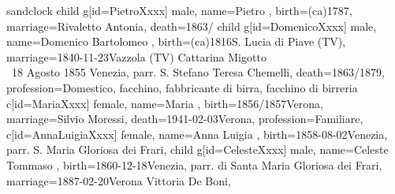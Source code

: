\documentclass{article}
\begin{document}
\begin{midpage}
\begin{center}

\begin{genealogypicture}[
    processing=database,
    database format=full,
    node size=3.5cm,
    level size=2.8cm,
    level distance=6mm,
    list separators hang=3mm,
    name font=\bfseries,
    surn code={\textcolor{black!50!black}{#1}},
    place text={\newline}{},
    date format=d month yyyy,
    tcbset={male/.style={colframe=blue,colback=blue!5},
    female/.style={colframe=red,colback=red!5}},
    box={fit basedim=7pt,boxsep=2pt,segmentation style=solid,
        halign=left,before upper=\parskip1pt,
        \gtrDBsex,
    },
]
sandclock
{
    child{
        g[id=PietroXxxx]{
            male,
            name={Pietro },
            birth={(ca)1787}{},
            marriage={Rivaletto Antonia}{},
            death={1863/}{}
        }
        child{
            g[id=DomenicoXxxx]{
                male,
                name={Domenico Bartolomeo },
                birth={(ca)1816}{S. Lucia di Piave (TV)},
                marriage={1840-11-23}{Vazzola (TV) \newline Cattarina Migotto \\ \gtrsymMarried~18 Agosto 1855 \newline \hspace*{3mm} Venezia, parr. S. Stefano \newline \hspace*{3mm} Teresa Chemelli},
                death={1863/1879}{},
                profession={Domestico, facchino, fabbricante di birra, facchino di birreria}
            }
            c[id=MariaXxxx]{
                female,
                name={Maria },
                birth={1856/1857}{Verona},
                marriage={Silvio Moressi}{},
                death={1941-02-03}{Verona},
                profession={Familiare},
            }
            c[id=AnnaLuigiaXxxx]{
                female,
                name={Anna Luigia },
                birth={1858-08-02}{Venezia, parr. S. Maria Gloriosa dei Frari},
            }
            child{
                g[id=CelesteXxxx]{
                    male,
                    name={Celeste Tommaso },
                    birth={1860-12-18}{Venezia, parr. di Santa Maria Gloriosa dei Frari},
                    marriage={1887-02-20}{Verona \newline Vittoria De Boni},
}}}}}
\end{genealogypicture}
\end{center}
\end{midpage}
\end{document}

